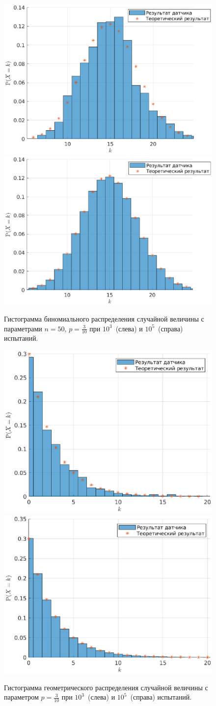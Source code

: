\clearpage
\begin{figure}[t]
        \includegraphics[width=0.5\linewidth]{task_01/bi1000.eps}
        \includegraphics[width=0.5\linewidth]{task_01/bi100000.eps}
        \caption{Гистограмма биномиального распределения случайной величины с параметрами $n = 50$, $p = \frac{3}{10}$ при $10^3$~(слева) и $10^5$~(справа) испытаний.}
\end{figure}
\begin{figure}[b]
        \includegraphics[width=0.5\linewidth]{task_01/geom1000.eps}
        \includegraphics[width=0.5\linewidth]{task_01/geom100000.eps}
        \caption{Гистограмма геометрического распределения случайной величины с параметром $p = \frac{3}{10}$ при $10^3$~(слева) и $10^5$~(справа) испытаний.}
\end{figure}
